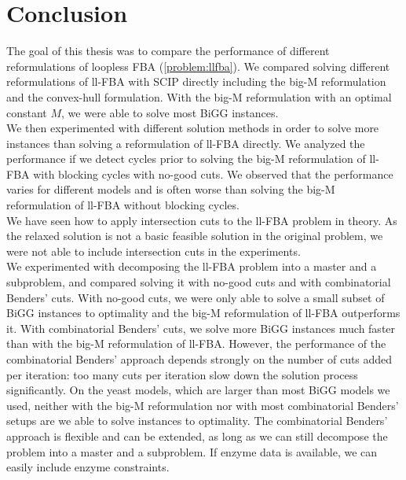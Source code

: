 \clearpage
\thispagestyle{plain}
\chapter*{Conclusion}
The goal of this thesis was to compare the performance of different reformulations of loopless FBA (\cref{problem:llfba}).
We compared solving different reformulations of \textsf{ll-FBA} with \textsf{SCIP} directly including the big-M reformulation and the convex-hull formulation. With the big-M reformulation with an optimal constant $M$, we were able to solve most BiGG instances. \\
We then experimented with different solution methods in order to solve more instances than solving a reformulation of \textsf{ll-FBA} directly.
We analyzed the performance if we detect cycles prior to solving the big-M reformulation of \textsf{ll-FBA} with blocking cycles with no-good cuts. We observed that the performance varies for different models and is often worse than solving the big-M reformulation of \textsf{ll-FBA} without blocking cycles.\\
We have seen how to apply intersection cuts to the \textsf{ll-FBA} problem in theory. As the relaxed solution is not a basic feasible solution in the original problem, we were not able to include intersection cuts in the experiments.
\\
We experimented with decomposing the \textsf{ll-FBA} problem into a master and a subproblem, and compared solving it with no-good cuts and with combinatorial Benders' cuts. With no-good cuts, we were only able to solve a small subset of BiGG instances to optimality and the big-M reformulation of \textsf{ll-FBA} outperforms it. With combinatorial Benders' cuts, we solve more BiGG instances much faster than with the big-M reformulation of \textsf{ll-FBA}. However, the performance of the combinatorial Benders' approach depends strongly on the number of cuts added per iteration: too many cuts per iteration slow down the solution process significantly. On the yeast models, which are larger than most BiGG models we used, neither with the big-M reformulation nor with most combinatorial Benders' setups are we able to solve instances to optimality. %
The combinatorial Benders' approach is flexible and can be extended, as long as we can still decompose the problem into a master and a subproblem.
If enzyme data is available, we can easily include enzyme constraints. %

